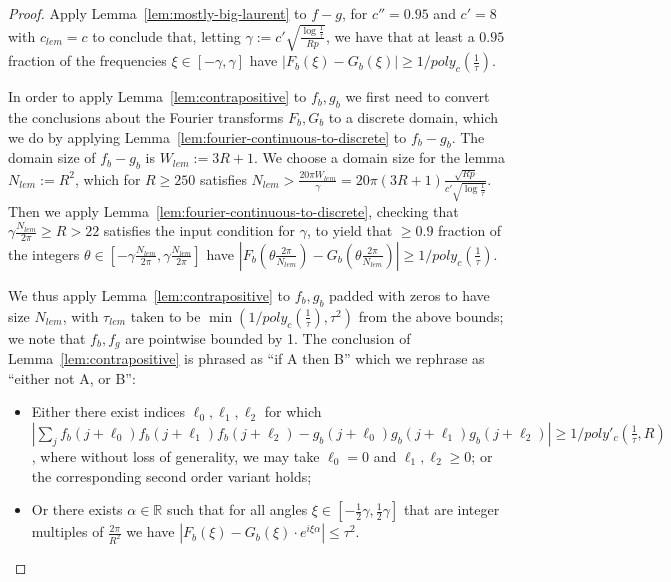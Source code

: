 \documentclass[11pt]{article}
\theoremstyle{plain}
\begin{document}
\begin{proof}
Apply Lemma~\ref{lem:mostly-big-laurent} to $f-g$, for $c''=0.95$ and $c'=8$ with $c_{lem}=c$ to conclude that, letting $\gamma:=c'\sqrt{\frac{\log\frac{1}{\tau}}{Rp}}$, we have that at least a $0.95$ fraction of the frequencies $\xi\in[-\gamma,\gamma]$ have $|F_b(\xi)-G_b(\xi)|\geq 1/poly_c(\frac{1}{\tau})$.

In order to apply Lemma~\ref{lem:contrapositive} to $f_b,g_b$ we first need to convert the conclusions about the Fourier transforms $F_b,G_b$ to a discrete domain, which we do by applying Lemma~\ref{lem:fourier-continuous-to-discrete} to $f_b-g_b$. The domain size of $f_b-g_b$ is $W_{lem}:=3R+1$. We choose a domain size for the lemma $N_{lem}:=R^2$, which for $R\geq 250$ satisfies $N_{lem} > \frac{20\pi W_{lem} }{ \gamma}=20\pi (3R+1) \frac{\sqrt{Rp}}{c'\sqrt{\log\frac{1}{\tau}}}$. Then we apply Lemma~\ref{lem:fourier-continuous-to-discrete}, checking that $\gamma\frac{N_{lem}}{2\pi}\geq R>22$ satisfies the input condition for $\gamma$, to yield that $\geq 0.9$ fraction of the integers $\theta\in[-\gamma\frac{N_{lem}}{2\pi},\gamma\frac{N_{lem}}{2\pi}]$ have $|F_b(\theta\frac{2\pi}{N_{lem}})-G_b(\theta\frac{2\pi}{N_{lem}})|\geq 1/poly_c(\frac{1}{\tau})$.

We thus apply Lemma~\ref{lem:contrapositive} to $f_b,g_b$ padded with zeros to have size $N_{lem}$, with $\tau_{lem}$ taken to be $\min(1/poly_c(\frac{1}{\tau}),\tau^2)$ from the above bounds; we note that $f_b,f_g$ are pointwise bounded by 1. The conclusion of Lemma~\ref{lem:contrapositive} is phrased as ``if A then B'' which we rephrase as ``either not A, or B'': 


\begin{itemize}
    \item[\textup{1)}] Either there exist indices $\ell_0,\ell_1,\ell_2$ for which $|\sum_j f_b(j+\ell_0)f_b(j+\ell_1)f_b(j+\ell_2)-g_b(j+\ell_0)g_b(j+\ell_1)g_b(j+\ell_2)|\geq 1/poly'_c(\frac{1}{\tau},R)$, where without loss of generality, we may take $\ell_0=0$ and $\ell_1,\ell_2\geq 0$; or the corresponding second order variant holds;
    \item[\textup{2)}] Or there exists $\alpha\in\mathbb{R}$ such that for all angles $\xi\in [-\frac{1}{2}\gamma,\frac{1}{2}\gamma]$ that are integer multiples of $\frac{2\pi}{R^2}$ we have $|F_b(\xi)-G_b(\xi)\cdot e^{i\xi \alpha}|\leq \tau^2$.
\end{itemize}


\end{proof}
\end{document}
